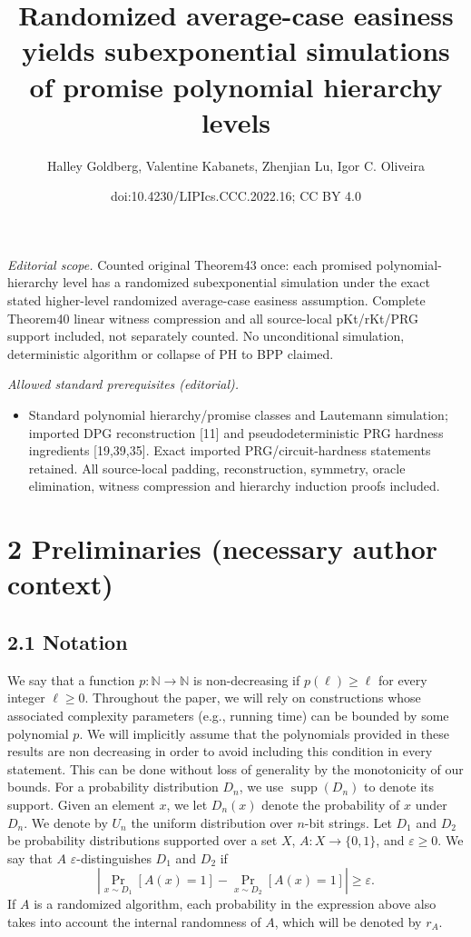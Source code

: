\documentclass[10pt,a4paper]{article}
\title{Randomized average-case easiness yields subexponential simulations of promise polynomial hierarchy levels}
\author{Halley Goldberg, Valentine Kabanets, Zhenjian Lu, Igor C. Oliveira}
\date{doi:10.4230/LIPIcs.CCC.2022.16; CC BY 4.0}
\begin{document}
\maketitle
\noindent\textit{Editorial scope.} Counted original Theorem43 once: each promised polynomial-hierarchy level has a randomized subexponential simulation under the exact stated higher-level randomized average-case easiness assumption. Complete Theorem40 linear witness compression and all source-local pKt/rKt/PRG support included, not separately counted. No unconditional simulation, deterministic algorithm or collapse of PH to BPP claimed.\par\medskip
\noindent\textit{Allowed standard prerequisites (editorial).}\begin{itemize}
\item Standard polynomial hierarchy/promise classes and Lautemann simulation; imported DPG reconstruction [11] and pseudodeterministic PRG hardness ingredients [19,39,35]. Exact imported PRG/circuit-hardness statements retained. All source-local padding, reconstruction, symmetry, oracle elimination, witness compression and hierarchy induction proofs included.
\end{itemize}\medskip
\section*{2 Preliminaries (necessary author context)}
\subsection*{2.1 Notation}
We say that a function $p:\mathbb N\to\mathbb N$ is non-decreasing if $p(\ell)\geq\ell$ for every integer $\ell\geq0$. Throughout the paper, we will rely on constructions whose associated complexity parameters (e.g., running time) can be bounded by some polynomial $p$. We will implicitly assume that the polynomials provided in these results are non decreasing in order to avoid including this condition in every statement. This can be done without loss of generality by the monotonicity of our bounds.
For a probability distribution $D_n$, we use $\operatorname{supp}(D_n)$ to denote its support. Given an element $x$, we let $D_n(x)$ denote the probability of $x$ under $D_n$. We denote by $U_n$ the uniform distribution over $n$-bit strings.
Let $D_1$ and $D_2$ be probability distributions supported over a set $X$, $A:X\to\{0,1\}$, and $\varepsilon\geq0$. We say that $A$ $\varepsilon$-distinguishes $D_1$ and $D_2$ if
\[\left|\Pr_{x\sim D_1}[A(x)=1]-\Pr_{x\sim D_2}[A(x)=1]\right|\geq\varepsilon.\]
If $A$ is a randomized algorithm, each probability in the expression above also takes into account the internal randomness of $A$, which will be denoted by $r_A$.
\end{document}
